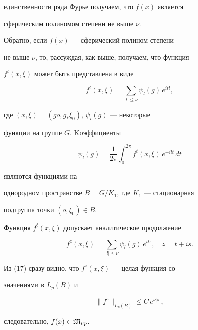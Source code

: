 \begin{pf}
единственности ряда Фурье получаем, что $f(x)$ является


сферическим полиномом степени не выше $\nu$.





Обратно, если $f(x)$ --- сферический полином степени


не выше $\nu$, то, рассуждая, как выше, получаем, что функция


$f^t(x,\xi)$ может быть представлена в виде


$$


f^t(x,\xi)=\sum_{|l|\le\nu} \psi_l(g)\,e^{itl},


$$


где $(x,\xi)=(go,g_*\xi_0)$, $\psi_l(g)$ --- некоторые


функции на группе $G$. Kоэффициенты


$$


\psi_l(g)=\frac1{2\pi}\int_0^{2\pi} f^t(x,\xi)\,e^{-ilt}\,dt


$$


являются функциями на


однородном пространстве $B=G/K_1$, где $K_1$ --- стационарная


подгруппа точки $(o,\xi_0)\in B$.


Функция $f^t(x,\xi)$ допускает аналитическое продолжение


\begin{equation}


f^z(x,\xi)=\sum_{|l|\le\nu}\psi_l(g)\,e^{ilz},\quad z=t+is.


\end{equation}


Из (17) сразу видно, что $f^z(x,\xi)$ --- целая функция со


значениями в $L_p(B)$ и


$$


\|f^z\|_{L_p(B)}\le C\,e^{\nu|s|},


$$


следовательно, $f(x)\in\frak M_{\nu p}$.


\end{pf}





